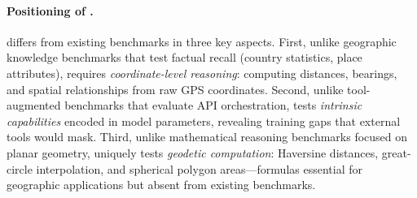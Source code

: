 \paragraph{Positioning of \dsName.}
\dsName differs from existing benchmarks in three key aspects. First, unlike geographic knowledge benchmarks that test factual recall (country statistics, place attributes), \dsName requires \textit{coordinate-level reasoning}: computing distances, bearings, and spatial relationships from raw GPS coordinates. Second, unlike tool-augmented benchmarks that evaluate API orchestration, \dsName tests \textit{intrinsic capabilities} encoded in model parameters, revealing training gaps that external tools would mask. Third, unlike mathematical reasoning benchmarks focused on planar geometry, \dsName uniquely tests \textit{geodetic computation}: Haversine distances, great-circle interpolation, and spherical polygon areas---formulas essential for geographic applications but absent from existing benchmarks.
